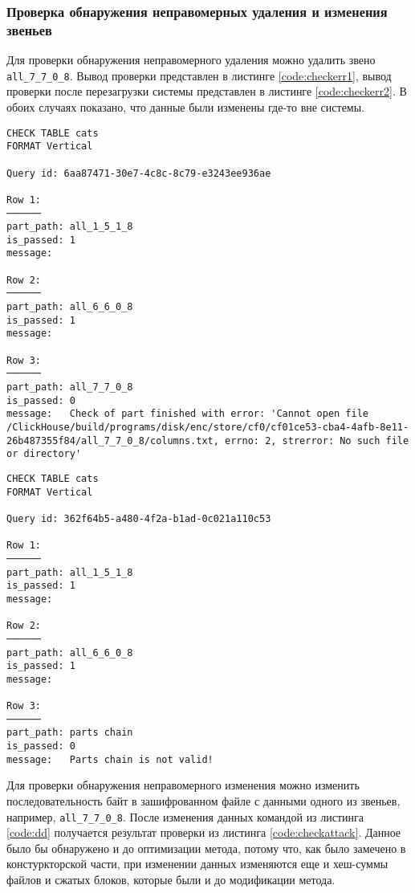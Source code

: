 \subsubsection{Проверка обнаружения неправомерных удаления и изменения звеньев}

Для проверки обнаружения неправомерного удаления можно удалить звено \texttt{all\_7\_7\_0\_8}. Вывод проверки представлен в листинге \ref{code:checkerr1}, вывод проверки после перезагрузки системы представлен в листинге \ref{code:checkerr2}. В обоих случаях показано, что данные были изменены где-то вне системы.

\pagebreak

\begin{lstlisting}[label=code:checkerr1, caption={Вывод системы после неправомерного удаления звена.}]
CHECK TABLE cats
FORMAT Vertical

Query id: 6aa87471-30e7-4c8c-8c79-e3243ee936ae

Row 1:
──────
part_path: all_1_5_1_8
is_passed: 1
message:

Row 2:
──────
part_path: all_6_6_0_8
is_passed: 1
message:

Row 3:
──────
part_path: all_7_7_0_8
is_passed: 0
message:   Check of part finished with error: 'Cannot open file /ClickHouse/build/programs/disk/enc/store/cf0/cf01ce53-cba4-4afb-8e11-26b487355f84/all_7_7_0_8/columns.txt, errno: 2, strerror: No such file or directory'
\end{lstlisting}

\pagebreak

\begin{lstlisting}[label=code:checkerr2, caption={Вывод системы после неправомерного удаления звена после перезагрузки системы.}]
CHECK TABLE cats
FORMAT Vertical

Query id: 362f64b5-a480-4f2a-b1ad-0c021a110c53

Row 1:
──────
part_path: all_1_5_1_8
is_passed: 1
message:

Row 2:
──────
part_path: all_6_6_0_8
is_passed: 1
message:

Row 3:
──────
part_path: parts chain
is_passed: 0
message:   Parts chain is not valid!
\end{lstlisting}

Для проверки обнаружения неправомерного изменения можно изменить последовательность байт в зашифрованном файле с данными одного из звеньев, например, \texttt{all\_7\_7\_0\_8}. После изменения данных командой из листинга \ref{code:dd} получается результат проверки из листинга \ref{code:checkattack}. Данное было бы обнаружено и до оптимизации метода, потому что, как было замечено в констуркторской части, при изменении данных изменяются еще и хеш-суммы файлов и сжатых блоков, которые были и до модификации метода.

